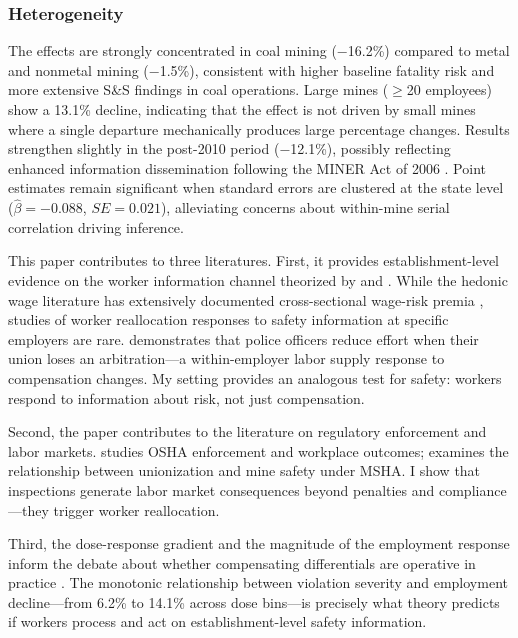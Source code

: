 \documentclass[12pt]{article}
\begin{document}
\subsubsection*{Heterogeneity} The effects are strongly concentrated in coal mining ($-$16.2\%) compared to metal and nonmetal mining ($-$1.5\%), consistent with higher baseline fatality risk and more extensive S\&S findings in coal operations. Large mines ($\geq$20 employees) show a 13.1\% decline, indicating that the effect is not driven by small mines where a single departure mechanically produces large percentage changes. Results strengthen slightly in the post-2010 period ($-$12.1\%), possibly reflecting enhanced information dissemination following the MINER Act of 2006 \citep{li2022miner}. Point estimates remain significant when standard errors are clustered at the state level ($\hat{\beta} = -0.088$, $SE = 0.021$), alleviating concerns about within-mine serial correlation driving inference.

This paper contributes to three literatures. First, it provides establishment-level evidence on the worker information channel theorized by \citet{viscusi1979employment} and \citet{rosen1986theory}. While the hedonic wage literature has extensively documented cross-sectional wage-risk premia \citep{kniesner2014compensating}, studies of worker reallocation responses to safety information at specific employers are rare. \citet{mas2008labour} demonstrates that police officers reduce effort when their union loses an arbitration---a within-employer labor supply response to compensation changes. My setting provides an analogous test for safety: workers respond to information about risk, not just compensation.

Second, the paper contributes to the literature on regulatory enforcement and labor markets. \citet{johnson2005osha} studies OSHA enforcement and workplace outcomes; \citet{morantz2013coal} examines the relationship between unionization and mine safety under MSHA. I show that inspections generate labor market consequences beyond penalties and compliance---they trigger worker reallocation.

Third, the dose-response gradient and the magnitude of the employment response inform the debate about whether compensating differentials are operative in practice \citep{kahn1990occupational, abowd1981compensating}. The monotonic relationship between violation severity and employment decline---from 6.2\% to 14.1\% across dose bins---is precisely what theory predicts if workers process and act on establishment-level safety information.
\end{document}
